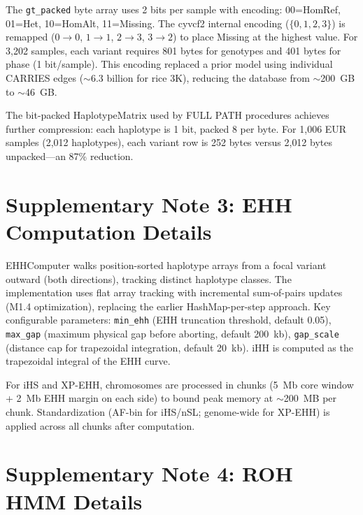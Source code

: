 The \texttt{gt\_packed} byte array uses 2 bits per sample with encoding: 00=HomRef, 01=Het, 10=HomAlt, 11=Missing. The cyvcf2 internal encoding ($\{0, 1, 2, 3\}$) is remapped ($0 \to 0$, $1 \to 1$, $2 \to 3$, $3 \to 2$) to place Missing at the highest value. For 3{,}202 samples, each variant requires 801 bytes for genotypes and 401 bytes for phase (1 bit/sample). This encoding replaced a prior model using individual CARRIES edges ($\sim$6.3 billion for rice 3K), reducing the database from $\sim$200~GB to $\sim$46~GB.

The bit-packed HaplotypeMatrix used by FULL PATH procedures achieves further compression: each haplotype is 1 bit, packed 8 per byte. For 1{,}006 EUR samples (2{,}012 haplotypes), each variant row is 252 bytes versus 2{,}012 bytes unpacked---an 87\% reduction.

\section{Supplementary Note 3: EHH Computation Details}

EHHComputer walks position-sorted haplotype arrays from a focal variant outward (both directions), tracking distinct haplotype classes. The implementation uses flat array tracking with incremental sum-of-pairs updates (M1.4 optimization), replacing the earlier HashMap-per-step approach. Key configurable parameters: \texttt{min\_ehh} (EHH truncation threshold, default 0.05), \texttt{max\_gap} (maximum physical gap before aborting, default 200~kb), \texttt{gap\_scale} (distance cap for trapezoidal integration, default 20~kb). iHH is computed as the trapezoidal integral of the EHH curve.

For iHS and XP-EHH, chromosomes are processed in chunks (5~Mb core window + 2~Mb EHH margin on each side) to bound peak memory at $\sim$200~MB per chunk. Standardization (AF-bin for iHS/nSL; genome-wide for XP-EHH) is applied across all chunks after computation.

\section{Supplementary Note 4: ROH HMM Details}


